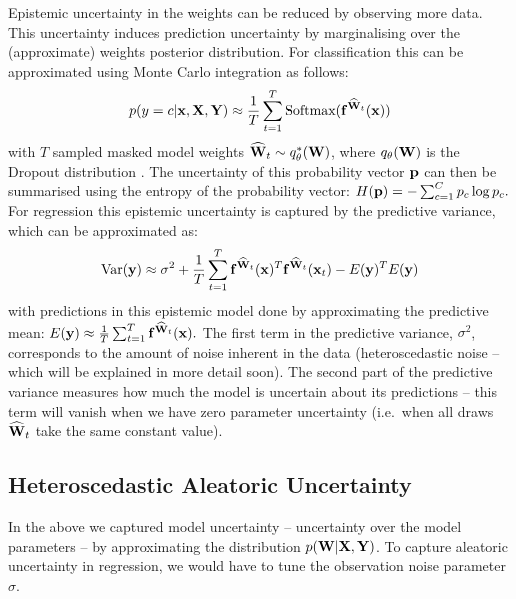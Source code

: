Epistemic uncertainty in the weights can be reduced by observing more data. This uncertainty induces prediction uncertainty by marginalising over the (approximate) weights posterior distribution. For classification this can be approximated using Monte Carlo integration as follows:
\begin{equation}
p(y=c | \mathbf{x}, \mathbf{X}, \mathbf{Y}) 
\approx
\frac{1}{T} \sum_{t=1}^T \text{Softmax}(\mathbf{f}^{{\widehat{\mathbf{W}}}_t}(\mathbf{x}))
\end{equation}
with $T$ sampled masked model weights ${\widehat{\mathbf{W}}}_t \sim q_\theta^*(\mathbf{W})$, where $q_\theta(\mathbf{W})$ is the Dropout distribution \citep{gal2016thesis}. 
The uncertainty of this probability vector $\mathbf{p}$ can then be summarised using the entropy of the probability vector:
$H(\mathbf{p}) = - \sum_{c=1}^C p_c \log p_c.$
For regression this epistemic uncertainty is captured by the predictive variance, which can be approximated as:
\begin{equation}
\text{Var}(\mathbf{y}) \approx \sigma^2 + \frac{1}{T} \sum_{t=1}^T \mathbf{f}^{{\widehat{\mathbf{W}}}_t}(\mathbf{x})^T \mathbf{f}^{{\widehat{\mathbf{W}}}_t}(\mathbf{x}_t) - E(\mathbf{y})^T E(\mathbf{y})
\end{equation}
with predictions in this epistemic model done by approximating the predictive mean: 
$E(\mathbf{y}) \approx \frac{1}{T} \sum_{t=1}^T \mathbf{f}^{{\widehat{\mathbf{W}}}_t}(\mathbf{x}).$
The first term in the predictive variance, $\sigma^2$, corresponds to the amount of noise inherent in the data (heteroscedastic noise -- which will be explained in more detail soon). The second part of the predictive variance measures how much the model is uncertain about its predictions -- this term will vanish when we have zero parameter uncertainty (i.e.\ when all draws ${\widehat{\mathbf{W}}}_t$ take the same constant value). 

\subsection{Heteroscedastic Aleatoric Uncertainty}
\label{sect:hetero}

In the above we captured model uncertainty -- uncertainty over the model parameters -- by approximating the distribution $p(\mathbf{W} | \mathbf{X}, \mathbf{Y})$. To capture aleatoric uncertainty in regression, we would have to tune the observation noise parameter $\sigma$.

